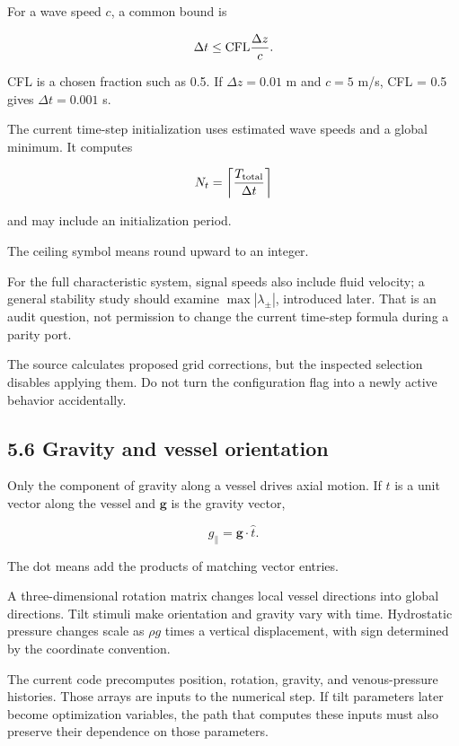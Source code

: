 \documentclass[11pt,a4paper]{article}
\begin{document}
For a wave speed \(c\), a common bound is


\begingroup\small
\[
\Delta t\leq {\rm CFL}\frac{\Delta z}{c}.
\]
\endgroup


CFL is a chosen fraction such as 0.5. If \(\Delta z=0.01\) m and \(c=5\) m/s, CFL = 0.5 gives \(\Delta t=0.001\) s.

The current time-step initialization uses estimated wave speeds and a global minimum. It computes


\begingroup\small
\[
N_t=\left\lceil\frac{T_{\rm total}}{\Delta t}\right\rceil
\]
\endgroup


and may include an initialization period.

The ceiling symbol means round upward to an integer.

For the full characteristic system, signal speeds also include fluid velocity; a general stability study should examine \(\max|\lambda_\pm|\), introduced later. That is an audit question, not permission to change the current time-step formula during a parity port.

The source calculates proposed grid corrections, but the inspected selection disables applying them. Do not turn the configuration flag into a newly active behavior accidentally.

\subsection{5.6 Gravity and vessel orientation}
Only the component of gravity along a vessel drives axial motion. If \(\hat t\) is a unit vector along the vessel and \(\mathbf g\) is the gravity vector,


\begingroup\small
\[
g_\parallel=\mathbf g\cdot\hat t.
\]
\endgroup


The dot means add the products of matching vector entries.

A three-dimensional rotation matrix changes local vessel directions into global directions. Tilt stimuli make orientation and gravity vary with time. Hydrostatic pressure changes scale as \(\rho g\) times a vertical displacement, with sign determined by the coordinate convention.

The current code precomputes position, rotation, gravity, and venous-pressure histories. Those arrays are inputs to the numerical step. If tilt parameters later become optimization variables, the path that computes these inputs must also preserve their dependence on those parameters.

\clearpage
\end{document}
